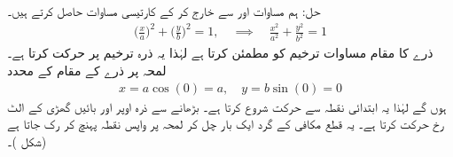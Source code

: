 حل:\quad
ہم مساوات  اور  سے  خارج کر کے کارتیسی مساوات حاصل کرتے ہیں۔
\begin{align*}
\big(\frac{x}{a}\big)^2+\big(\frac{y}{b}\big)^2=1,\quad \implies\quad \frac{x^2}{a^2}+\frac{y^2}{b^2}=1
\end{align*}
ذرے کا مقام مساوات ترخیم  کو مطمئن کرتا ہے لہٰذا یہ ذرہ ترخیم پر حرکت کرتا ہے۔ لمحہ  پر ذرے کے مقام کے محدد
\begin{align*}
x=a\cos (0)=a,\quad y=b\sin(0)=0
\end{align*}
ہوں گے لہٰذا یہ ابتدائی نقطہ  سے حرکت شروع کرتا ہے۔  بڑھانے سے ذرہ اوپر اور بائیں گھڑی کے الٹ رخ حرکت کرتا ہے۔ یہ قطع مکافی کے گرد ایک بار چل کر لمحہ  پر واپس نقطہ  پہنچ کر رک جاتا ہے (شکل )۔ 
